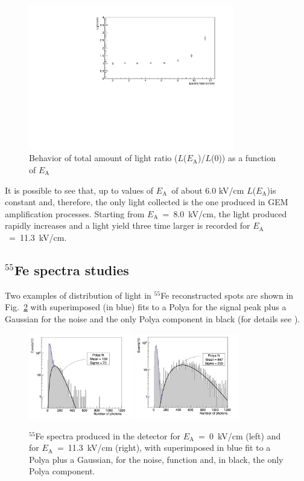\documentclass[a4paper,11pt]{article}
\newcommand{\Ea}  {$E_{\mathrm{A}}$}
\newcommand{\La}  {$L$(\Ea)}
\begin{document}
\begin{figure}[h!]
\centering
\includegraphics[width=0.80\textwidth]{gLightNorm.pdf}
\caption{Behavior of total amount of light ratio ($L$(\Ea)/$L$(0)) as a function of \Ea} 
\label{fig:light}
\end{figure}

It is possible to see that, up to values of \Ea\ of about 6.0 kV/cm \La is constant and, therefore, the only light collected is the one produced in GEM amplification processes. Starting from 
\Ea~=~8.0~kV/cm, the light produced rapidly increases and a light yield three time larger is recorded for \Ea~=~11.3~kV/cm.

\subsection{$^{55}$Fe spectra studies}
\label{sec:55fe}
Two examples of distribution of light in $^{55}$Fe reconstructed spots are shown in Fig.~\ref{fig:qIn} with superimposed (in blue) fits to a Polya for the signal peak plus a Gaussian for the noise and the only Polya component in black (for details see \cite{bib:fe55}).

\begin{figure}[h!]
\centering
\includegraphics[width=0.407\textwidth]{hqIn_3540.png}
\includegraphics[width=0.4\textwidth]{hqIn_3629.png}
\caption{$^{55}$Fe spectra produced in the detector for \Ea~=~0~kV/cm (left) and for \Ea~=~11.3~kV/cm (right), with superimposed in blue fit to a Polya plus a Gaussian, for the noise, function and, in black, the only Polya component.} 
\label{fig:qIn}
\end{figure}
\end{document}
